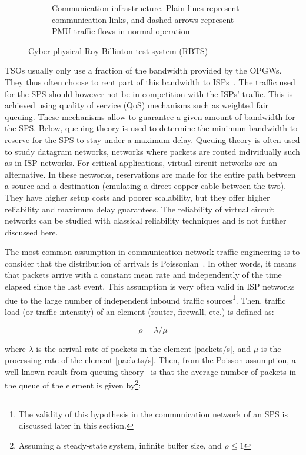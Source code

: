\begin{figure}
\begin{subfigure}[b]{0.45\textwidth}
         \caption{Communication infrastructure. Plain lines represent communication links, and dashed arrows represent PMU traffic flows in normal operation}
         \label{fig:RBTS-cyber}
     \end{subfigure}
\caption{Cyber-physical Roy Billinton test system (RBTS)}
\label{fig:RBTS}
\end{figure}

TSOs usually only use a fraction of the bandwidth provided by the OPGWs. They thus often choose to rent part of this bandwidth to ISPs~\cite[p110]{bookUK_OPGW}. The traffic used for the SPS should however not be in competition with the ISPs' traffic. This is achieved using quality of service (QoS) mechanisms such as weighted fair queuing. These mechanisms allow to guarantee a given amount of bandwidth for the SPS. Below, queuing theory is used to determine the minimum bandwidth to reserve for the SPS to stay under a maximum delay. Queuing theory is often used to study datagram networks, \ie networks where packets are routed individually such as in ISP networks. For critical applications, virtual circuit networks are an alternative. In these networks, reservations are made for the entire path between a source and a destination (emulating a direct copper cable between the two). They have higher setup costs and poorer scalability, but they offer higher reliability and maximum delay guarantees. The reliability of virtual circuit networks can be studied with classical reliability techniques and is not further discussed here.

The most common assumption in communication network traffic engineering is to consider that the distribution of arrivals is Poissonian~\cite{trafficBook}. In other words, it means that packets arrive with a constant mean rate and independently of the time elapsed since the last event. This assumption is very often valid in ISP networks due to the large number of independent inbound traffic sources\footnote{The validity of this hypothesis in the communication network of an SPS is discussed later in this section.}. Then, traffic load (or traffic intensity) of an element (router, firewall, etc.) is defined as:

\begin{equation}
\rho = \lambda/\mu
\end{equation}

\noindent where \(\lambda\) is the arrival rate of packets in the element [packets/s], and \(\mu\) is the processing rate of the element [packets/s]. Then, from the Poisson assumption, a well-known result from queuing theory~\cite{trafficBook} is that the average number of packets in the queue of the element is given by\footnote{Assuming a steady-state system, infinite buffer size, and \(\rho \leq 1\)}:

